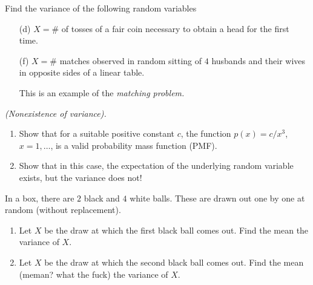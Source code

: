 \begin{problem}[Handout 7, \# 6(d, f)]
  Find the variance of the following random variables
  \begin{itemize}[noitemsep]
  \item[(d)] \(X=\#\) of tosses of a fair coin necessary to obtain a head
    for the first time.
  \item[(f)] \(X=\#\) matches observed in random sitting of \(4\) husbands
    and their wives in opposite sides of a linear table.

    This is an example of the \emph{matching problem.}
  \end{itemize}
\end{problem}
\begin{solution}

\end{solution}
\newpage

\begin{problem}[Handout 7, \# 8]
  \emph{(Nonexistence of variance).}
  \begin{enumerate}[label=(\alph*),noitemsep]
  \item Show that for a suitable positive constant \(c\), the function
    \(p(x)=c/x^3\), \(x=1,\dots\), is a valid probability mass function
    (PMF).
  \item Show that in this case, the expectation of the underlying random
    variable exists, but the variance does not!
  \end{enumerate}

\end{problem}
\begin{solution}

\end{solution}
\newpage

\begin{problem}[Handout 7, \# 9]
  In a box, there are \(2\) black and \(4\) white balls. These are drawn
  out one by one at random (without replacement).
  \begin{enumerate}[label=(\alph*),noitemsep]
  \item Let \(X\) be the draw at which the first black ball comes out. Find
    the mean the variance of \(X\).
  \item Let \(X\) be the draw at which the second black ball comes
    out. Find the mean (meman? what the fuck) the variance of \(X\).
  \end{enumerate}
\end{problem}
\begin{solution}

\end{solution}
\newpage

